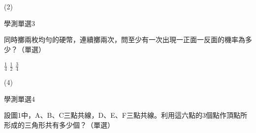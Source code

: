 \begin{QUESTIONS}
\begin{QUESTION}
        \begin{QTAGS}\end{QTAGS}
        \begin{QANS}
            (2)
        \end{QANS}
        \begin{QSOLLIST}
        \end{QSOLLIST}
        \begin{QEMPTYSPACE}
        \end{QEMPTYSPACE}
    \end{QUESTION}
    \begin{QUESTION}
        \begin{ExamInfo}{83}{學測}{單選}{3}
        \end{ExamInfo}
        \begin{ExamAnsRateInfo}{}{}{}{}
        \end{ExamAnsRateInfo}
        \begin{QBODY}
            同時擲兩枚均勻的硬幣，連續擲兩次，問至少有一次出現一正面一反面的機率為多少？（單選）
            \begin{QOPS}
            \QOP $\frac{1}{4}$
            \QOP $\frac{1}{2}$
            \QOP $\frac{3}{4}$
            \end{QOPS}        
        \end{QBODY}
        \begin{QFROMS}
        \end{QFROMS}
        \begin{QTAGS}\end{QTAGS}
        \begin{QANS}
            (4)
        \end{QANS}
        \begin{QSOLLIST}
        \end{QSOLLIST}
        \begin{QEMPTYSPACE}
        \end{QEMPTYSPACE}
    \end{QUESTION}
    \begin{QUESTION}
        \begin{ExamInfo}{83}{學測}{單選}{4}
        \end{ExamInfo}
        \begin{ExamAnsRateInfo}{}{}{}{}
        \end{ExamAnsRateInfo}
        \begin{QBODY}
            設圖1中，A、B、C三點共線，D、E、F三點共線。利用這六點的3個點作頂點所形成的三角形共有多少個？（單選）

\end{QBODY}
\end{QUESTION}
\end{QUESTIONS}
